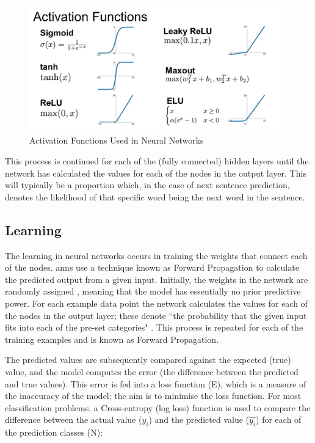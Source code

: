 \begin{figure}[h]
    \centering
    \includegraphics[height=5.5cm,trim={0 0 0 3.5cm},clip]{paper/images/activation_functions.png}
    \caption{Activation Functions Used in Neural Networks \citep{Udofia}}
    \label{fig:activation_functions}
\end{figure}

This process is continued for each of the (fully connected) hidden layers until the network has calculated the values for each of the nodes in the output layer. This will typically be a proportion which, in the case of next sentence prediction, denotes the likelihood of that specific word being the next word in the sentence.

\subsection{Learning}\label{sec:background_anns_learning}
The learning in neural networks occurs in training the weights that connect each of the nodes. \acrlong{ann}s use a technique known as Forward Propagation to calculate the predicted output from a given input. Initially, the weights in the network are randomly assigned \citep{Bishop}, meaning that the model has essentially no prior predictive power. For each example data point the network calculates the values for each of the nodes in the output layer; these denote ``the probability that the given input fits into each of the pre-set categories" \citep{Yathish}. This process is repeated for each of the training examples and is known as Forward Propagation. 

The predicted values are subsequently compared against the expected (true) value, and the model computes the error (the difference between the predicted and true values). This error is fed into a loss function (E), which is a measure of the inaccuracy of the model; the aim is to minimise the loss function. For most classification problems, a Cross-entropy (log loss) function is used to compare the difference between the actual value ($y_i$) and the predicted value ($\hat{y_i}$) for each of the prediction classes (N):

